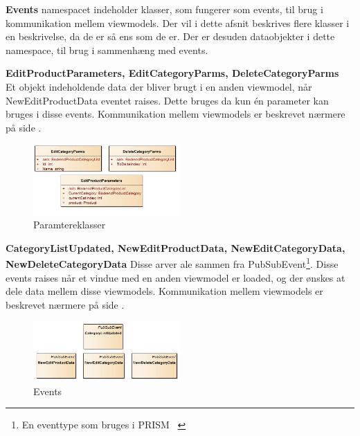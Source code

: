 \bigskip
\bigskip




\textbf{Events} namespacet indeholder klasser, som fungerer som events, til brug i kommunikation mellem viewmodels. Der vil i dette afsnit beskrives flere klasser i en beskrivelse, da de er så ens som de er. Der er desuden dataobjekter i dette namespace, til brug i sammenhæng med events.\\
\bigskip

\textbf{EditProductParameters, EditCategoryParms, DeleteCategoryParms}\\
Et objekt indeholdende data der bliver brugt i en anden viewmodel, når NewEditProductData eventet raises. Dette bruges da kun én parameter kan bruges i disse events. Kommunikation mellem viewmodels er beskrevet nærmere på side \pageref{viewcomm}. \bigskip
\begin{center}
\begin{figure}[!h]
    \centering
    \includegraphics[width=0.50\textwidth]{Systemdesign/backend/klassebeskrivelser/Images/Parms.png}
    \caption{Paramtereklasser}
    \label{fig:EditProductParameters}
\end{figure}
\end{center}
\label{EditProductParameters_Beskrivelse}
 \bigskip 




\textbf{CategoryListUpdated, NewEditProductData, NewEditCategoryData, NewDeleteCategoryData}
Disse arver ale sammen fra PubSubEvent\footnote{En eventtype som bruges i PRISM ~\cite{PRISM}}. Disse events raises når et vindue med en anden viewmodel er loaded, og der ønskes at dele data mellem disse viewmodels. Kommunikation mellem viewmodels er beskrevet nærmere på side \pageref{viewcomm}.  \bigskip
\begin{center}
\begin{figure}[!h]
    \centering
    \includegraphics[width=0.50\textwidth]{Systemdesign/backend/klassebeskrivelser/Images/Events1.png}
    \caption{Events}
    \label{fig:CategoryListUpdated}
\end{figure}
\end{center}
\label{CategoryListUpdated_Beskrivelse}
 \bigskip 



